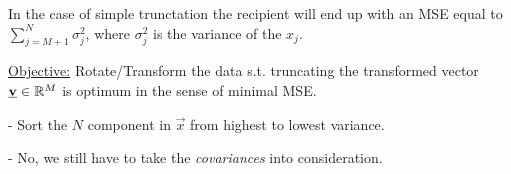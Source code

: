 \begin{frame}


In the case of simple trunctation 
the recipient will end up with an MSE equal to $\sum_{j=M+1}^{N} \sigma_j^2$, where $\sigma_j^2$ is the variance of the $x_j$.

\pause

\slidesonly{\vspace{5mm}}

\underline{Objective:} Rotate/Transform the data s.t. truncating the transformed vector $\underline{\mathbf{v}} \in \mathbb{R}^M$ is optimum in the sense of minimal MSE.



\pause

- Sort the $N$ component in $\vec x$ from highest to lowest variance. 


- No, we still have to take the \emph{covariances} into consideration.

\end{frame}

